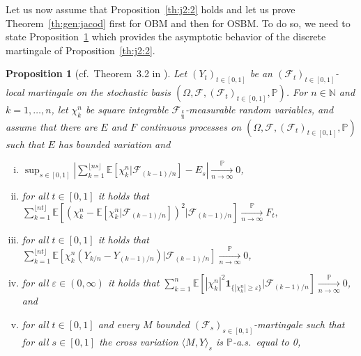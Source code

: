\documentclass[12pt]{article}
\numberwithin{equation}{section}
\newtheorem{proposition}{Proposition}
\theoremstyle{definition}
\theoremstyle{remark}
\newcommand{\convp}[1][]{\xrightarrow[#1]{\PP}}
\newcommand{\NN}{\mathbb{N}}
\newcommand{\PP}{\mathbb{P}}
\newcommand{\EE}{\mathbb{E}}
\newcommand{\cF}{\mathcal{F}}
\newcommand{\ind}[1]{\mathbf{1}_{#1}}
\begin{document}
Let us now assume that Proposition~\ref{th:j2:2} holds and let us prove Theorem~\ref{th:gen:jacod} first for OBM and then for OSBM. To do so, we need to state Proposition~\ref{th:j2} which provides the asymptotic behavior of the discrete martingale of Proposition~\ref{th:j2:2}.

\begin{proposition}[cf.~Theorem~3.2 in \cite{j2}] \label{th:j2}
Let $(Y_t)_{t\in [0,1]}$ be an $(\mathcal{F}_t)_{t\in [0,1]}$-local martingale on the stochastic basis $(\Omega,\mathcal{F}, (\mathcal{F}_t)_{t\in [0,1]},\PP)$.
For $n\in \NN$ and $k=1,\ldots, n$, let %
$\chi^n_k$ be square integrable $\mathcal{F}_{\frac{k}{n}}$-measurable random variables, and assume that there are $E$ and $F$
continuous processes on 
$(\Omega, \cF, (\mathcal{F}_t)_{t\in [0,1]},\PP)$ such that $E$ has bounded variation and
\begin{enumerate}[i)]
\item \label{th:j2:item1}
$
	\sup_{s\in [0,1]} \left|\sum_{k=1}^{\lfloor n s \rfloor} \EE\!\left[ \chi_k^n | \cF_{(k-1)/n}\right]- E_s\right| \convp[n\to\infty] 0
$,
\item \label{th:j2:item2}
for all $t\in [0,1]$ it holds that
$
		\sum_{k=1}^{\lfloor n t \rfloor} \EE\!\left[ \left(\chi_k^n- \EE\!\left[ \chi_k^n | \cF_{(k-1)/n}\right]\right)^{\!2} | \cF_{(k-1)/n}\right] \convp[n\to\infty] F_t,
$
\item \label{th:j2:item3}
for all $t\in [0,1]$ it holds that
$
	\sum_{k=1}^{\lfloor n t \rfloor} \EE\!\left[ \chi_k^n (Y_{k/n}-Y_{{(k-1)}/n})| \cF_{(k-1)/n}\right] \convp[n\to\infty] 0 %
$,
\item \label{th:j2:item4}
for all $\varepsilon \in (0,\infty)$ it holds that
$
	 \sum_{k=1}^{n} \EE\!\left[ |\chi_k^n|^2 \ind{\{|\chi_k^n|\geq  \varepsilon \}}| \cF_{(k-1)/n}\right] \convp[n\to\infty] 0
$, and
\item \label{th:j2:item5}
for all $t\in [0,1]$ and every 
$M$ bounded $(\mathcal{F}_s)_{s\in [0,1]}$-martingale such that for all $s\in [0,1]$ the cross variation $\langle M, Y\rangle_s$ is $\mathbb P$-a.s.~equal to 0, %

\end{enumerate}
\end{proposition}
\end{document}
